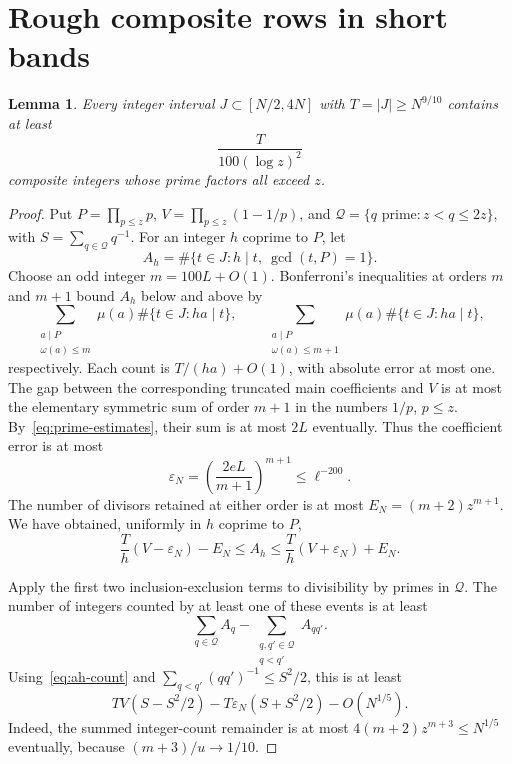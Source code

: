 \documentclass[11pt]{article}
\newtheorem{lemma}[theorem]{Lemma}
\theoremstyle{definition}
\theoremstyle{remark}
\begin{document}
\section{Rough composite rows in short bands}

\begin{lemma}\label{lem:rough-composites}
Every integer interval $J\subset[N/2,4N]$ with $T=|J|\geq N^{9/10}$
contains at least
\begin{equation}\label{eq:rough-count}
                          \frac{T}{100(\log z)^2}
\end{equation}
composite integers whose prime factors all exceed $z$.
\end{lemma}
\begin{proof}
Put $P=\prod_{p\leq z}p$, $V=\prod_{p\leq z}(1-1/p)$, and
$\mathcal Q=\{q\text{ prime}:z<q\leq2z\}$, with
$S=\sum_{q\in\mathcal Q}q^{-1}$.
For an integer $h$ coprime to $P$, let
\[
                  A_h=\#\{t\in J:h\mid t,\ \gcd(t,P)=1\}.
\]
Choose an odd integer $m=100L+O(1)$. Bonferroni's inequalities at orders
$m$ and $m+1$ bound $A_h$ below and above by
\[
 \sum_{\substack{a\mid P\\\omega(a)\leq m}}\mu(a)
                       \#\{t\in J:ha\mid t\},\qquad
 \sum_{\substack{a\mid P\\\omega(a)\leq m+1}}\mu(a)
                       \#\{t\in J:ha\mid t\},
\]
respectively. Each count is $T/(ha)+O(1)$, with absolute error at most one.
The gap between the corresponding truncated main coefficients and $V$
is at most the elementary symmetric sum of order $m+1$ in the numbers
$1/p$, $p\leq z$. By~\eqref{eq:prime-estimates}, their sum is at most
$2L$ eventually. Thus the coefficient error is at most
\begin{equation}\label{eq:bonferroni-error}
 \varepsilon_N=\left(\frac{2eL}{m+1}\right)^{m+1}
                              \leq\ell^{-200}.
\end{equation}
The number of divisors retained at either order is at most
$E_N=(m+2)z^{m+1}$. We have obtained, uniformly in $h$ coprime to $P$,
\begin{equation}\label{eq:ah-count}
 \frac{T}{h}(V-\varepsilon_N)-E_N
 \leq A_h\leq
 \frac{T}{h}(V+\varepsilon_N)+E_N.
\end{equation}

Apply the first two inclusion-exclusion terms to divisibility by primes
in $\mathcal Q$. The number of integers counted by at least one of these
events is at least
\[
             \sum_{q\in\mathcal Q}A_q
                -\sum_{\substack{q,q'\in\mathcal Q\\q<q'}}A_{qq'}.
\]
Using~\eqref{eq:ah-count} and
$\sum_{q<q'}(qq')^{-1}\leq S^2/2$, this is at least
\begin{equation}\label{eq:rough-union}
 T V(S-S^2/2)-T\varepsilon_N(S+S^2/2)-O(N^{1/5}).
\end{equation}
Indeed, the summed integer-count remainder is at most
$4(m+2)z^{m+3}\leq N^{1/5}$ eventually, because
$(m+3)/u\longrightarrow1/10$.


\end{proof}
\end{document}
